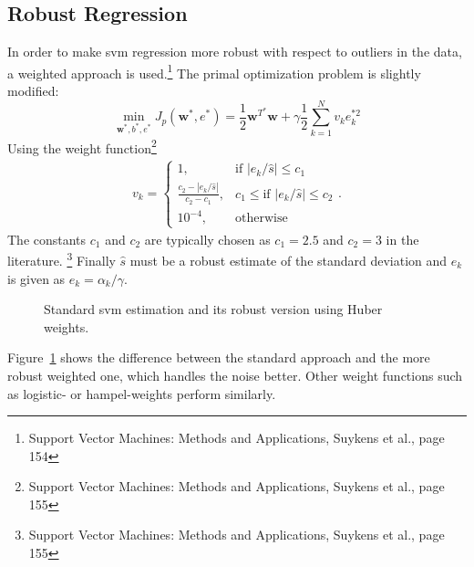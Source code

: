 \subsection{Robust Regression}
In order to make svm regression more robust with respect to outliers in the data, a weighted approach is used.\footnote{Support Vector Machines: Methods and Applications, Suykens et al., page 154} The primal optimization problem is slightly modified:
\begin{equation}
\min\limits_{\mathbf{w}^*,b^*,e^*} J_p (\mathbf{w}^*,e^*) = \frac{1}{2} \mathbf{w}^{T^*}\mathbf{w} + \gamma \frac{1}{2}\sum\limits_{k = 1}^{N} v_k e_k^{*2}
\end{equation}
Using the weight function\footnote{Support Vector Machines: Methods and Applications, Suykens et al., page 155}
\begin{align}
v_k = \begin{cases}
      	1, & \text{if }  |e_k / \hat{s} | \leq c_1 \\
      	\frac{c_2 - |e_k / \hat{s} | }{c_2 - c_1 }, &  c_1 \leq \text{if } |e_k / \hat{s} | \leq c_2 \\
      	10^{-4}, & \text{otherwise}
      \end{cases}.
\end{align} 
The constants $c_1$ and $c_2$ are typically chosen as $c_1 = 2.5$ and $c_2 = 3$ in the literature. \footnote{Support Vector Machines: Methods and Applications, Suykens et al., page 155} Finally $\hat{s}$ must be a robust estimate of the standard deviation and $e_k$ is given as $e_k = \alpha_k / \gamma$.  
\begin{figure}
\centering


\caption{Standard svm estimation and its robust version using Huber weights.}
\label{fig:robustSVM}
\end{figure}
Figure~\ref{fig:robustSVM} shows the difference between the standard approach and the more robust weighted one, which handles the noise better. Other weight functions such as logistic- or hampel-weights perform similarly.
